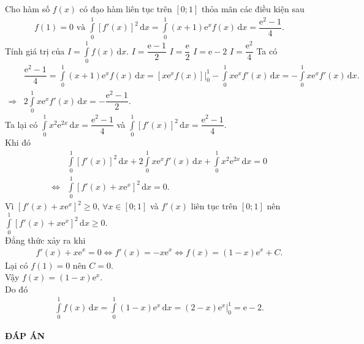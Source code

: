 \begin{ex}%
 Cho hàm số $f(x)$ có đạo hàm liên tục trên $[0;1]$ thỏa mãn các điều kiện sau
 \begin{eqnarray*}
  f(1)=0 \text{ và } \displaystyle\int\limits_0^1 \left[f'(x)\right]^2\mathrm{\,d}x = \displaystyle\int\limits_0^1 (x+1)\mathrm{e}^x f(x)\mathrm{\,d}x = \dfrac{\mathrm{e}^2-1}{4}.
 \end{eqnarray*}
 Tính giá trị của $I=\displaystyle\int\limits_0^1 f(x)\mathrm{\,d}x$.
 \choice
  {$I=\dfrac{\mathrm{e}-1}{2}$}
  {$I=\dfrac{\mathrm{e}}{2}$}
  {\True $I=\mathrm{e}-2$}
  {$I=\dfrac{\mathrm{e}^2}{4}$}
 \loigiai
  {
  Ta có
  \begin{align*}
   & \dfrac{\mathrm{e}^2 - 1}{4} = \displaystyle\int\limits_0^1 (x+1)\mathrm{e}^x f(x) \mathrm{\,d}x = \left[ x \mathrm{e}^x f(x) \right]\Big|_0^1 - \displaystyle\int\limits_0^1 x \mathrm{e}^x f'(x) \mathrm{\,d}x = -\displaystyle\int\limits_0^1 x \mathrm{e}^x f'(x) \mathrm{\,d}x.\\
   \Rightarrow & 2\displaystyle\int\limits_0^1 x \mathrm{e}^x f'(x) \mathrm{\,d}x = -\dfrac{\mathrm{e^2 - 1}}{2}.
  \end{align*}
  Ta lại có $\displaystyle\int\limits_0^1 x^2 \mathrm{e}^{2x} \mathrm{\,d}x = \dfrac{\mathrm{e}^2 - 1}{4}$ và $\displaystyle\int\limits_0^1 \left[ f'(x) \right]^2 \mathrm{\,d}x = \dfrac{\mathrm{e^2} - 1}{4}$.\\
  Khi đó
  \begin{align*}
   & \displaystyle\int\limits_0^1 \left[ f'(x) \right]^2 \mathrm{\,d}x + 2\displaystyle\int\limits_0^1 x \mathrm{e}^x f'(x) \mathrm{\,d}x + \displaystyle\int\limits_0^1 x^2 \mathrm{e}^{2x} \mathrm{\,d}x = 0 \\
   \Leftrightarrow & \displaystyle\int\limits_0^1 \left[ f'(x) + x \mathrm{e}^x \right]^2 \mathrm{\,d}x = 0.
  \end{align*}
  Vì $\left[ f'(x) + x \mathrm{e}^x \right]^2 \geq 0, \, \forall x \in [0;1]$ và $f'(x)$ liên tục trên $[0;1]$ nên $\displaystyle\int\limits_0^1 \left[ f'(x) + x \mathrm{e}^x \right]^2 \mathrm{\,d}x \geq 0$.\\
  Đẳng thức xảy ra khi
  \begin{align*}
   f'(x) + x \mathrm{e}^x = 0 \Leftrightarrow f'(x) = -x \mathrm{e}^x \Leftrightarrow f(x) = (1 - x) \mathrm{e}^x + C.
  \end{align*}
  Lại có $f(1) = 0$ nên $C = 0$.\\
  Vậy $f(x) = (1 - x) \mathrm{e}^x$.\\
  Do đó 
  \begin{align*}
   \displaystyle\int\limits_0^1 f(x) \mathrm{\,d}x = \displaystyle\int\limits_0^1 (1 - x) \mathrm{e}^x \mathrm{\,d}x = (2 - x) \mathrm{e}^x \big|_0^1 = \mathrm{e} - 2.
  \end{align*}
  }
\end{ex}



\newpage
\begin{center}
	\textbf{ĐÁP ÁN}
\end{center}
\begin{multicols}{10}
	 
\end{multicols}

